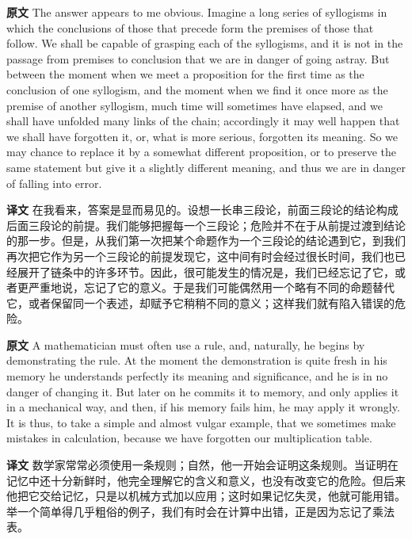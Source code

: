 \documentclass[UTF8,zihao=-4]{ctexart}
\newcommand{\BodyFont}{\fontsize{10.5pt}{15.5pt}\selectfont}
\newcommand{\origlabel}{\textbf{原文}\quad}
\newcommand{\translabel}{\textbf{译文}\quad}
\newenvironment{enblock}{\par\noindent\begingroup\BodyFont\origlabel}{\par\endgroup}
\newenvironment{zhblock}{\par\noindent\begingroup\BodyFont\translabel}{\par\endgroup\vspace{0.35em}}
\begin{document}
\begin{enblock}
The answer appears to me obvious. Imagine a long series of syllogisms in which the conclusions of those that precede form the premises of those that follow. We shall be capable of grasping each of the syllogisms, and it is not in the passage from premises to conclusion that we are in danger of going astray. But between the moment when we meet a proposition for the first time as the conclusion of one syllogism, and the moment when we find it once more as the premise of another syllogism, much time will sometimes have elapsed, and we shall have unfolded many links of the chain; accordingly it may well happen that we shall have forgotten it, or, what is more serious, forgotten its meaning. So we may chance to replace it by a somewhat different proposition, or to preserve the same statement but give it a slightly different meaning, and thus we are in danger of falling into error.
\end{enblock}
\begin{zhblock}
在我看来，答案是显而易见的。设想一长串三段论，前面三段论的结论构成后面三段论的前提。我们能够把握每一个三段论；危险并不在于从前提过渡到结论的那一步。但是，从我们第一次把某个命题作为一个三段论的结论遇到它，到我们再次把它作为另一个三段论的前提发现它，这中间有时会经过很长时间，我们也已经展开了链条中的许多环节。因此，很可能发生的情况是，我们已经忘记了它，或者更严重地说，忘记了它的意义。于是我们可能偶然用一个略有不同的命题替代它，或者保留同一个表述，却赋予它稍稍不同的意义；这样我们就有陷入错误的危险。\end{zhblock}

\begin{enblock}
A mathematician must often use a rule, and, naturally, he begins by demonstrating the rule. At the moment the demonstration is quite fresh in his memory he understands perfectly its meaning and significance, and he is in no danger of changing it. But later on he commits it to memory, and only applies it in a mechanical way, and then, if his memory fails him, he may apply it wrongly. It is thus, to take a simple and almost vulgar example, that we sometimes make mistakes in calculation, because we have forgotten our multiplication table.
\end{enblock}
\begin{zhblock}
数学家常常必须使用一条规则；自然，他一开始会证明这条规则。当证明在记忆中还十分新鲜时，他完全理解它的含义和意义，也没有改变它的危险。但后来他把它交给记忆，只是以机械方式加以应用；这时如果记忆失灵，他就可能用错。举一个简单得几乎粗俗的例子，我们有时会在计算中出错，正是因为忘记了乘法表。\end{zhblock}
\end{document}
